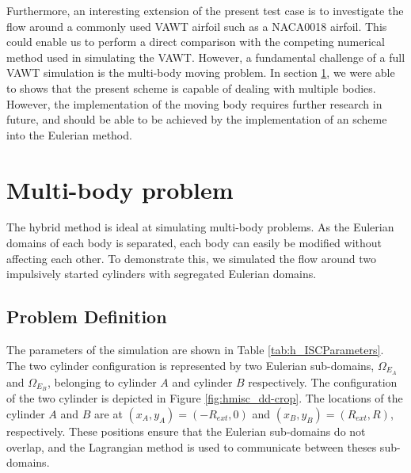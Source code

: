 Furthermore, an interesting extension of the present test case is to investigate the flow around a commonly used VAWT airfoil such as a NACA0018 airfoil. This could enable us to perform a direct comparison with the competing numerical method used in simulating the VAWT. However, a fundamental challenge of a full VAWT simulation is the multi-body moving problem. In section \ref{sec:vvhm-mb}, we were able to shows that the present scheme is capable of dealing with multiple bodies. However, the implementation of the moving body requires further research in future, and should be able to be achieved by the implementation of an  scheme into the Eulerian method.

	
\section{Multi-body problem}
\label{sec:vvhm-mb}

The hybrid method is ideal at simulating multi-body problems. As the Eulerian domains of each body is separated, each body can easily be modified without affecting each other. To demonstrate this, we simulated the flow around two impulsively started cylinders with segregated Eulerian domains. 

\subsection{Problem Definition}

The parameters of the simulation are shown in Table \ref{tab:h_ISCParameters}. The two cylinder configuration is represented by two Eulerian sub-domains, $\Omega_{E_{A}}$ and $\Omega_{E_B}$, belonging to cylinder $A$ and cylinder $B$ respectively. The configuration of the two cylinder is depicted in Figure \ref{fig:hmisc_dd-crop}. The locations of the cylinder $A$ and $B$ are at $(x_A,y_A) = (-R_{ext},0)$ and $(x_B,y_B) = (R_{ext},R)$, respectively. These positions ensure that the Eulerian sub-domains do not overlap, and the Lagrangian method is used to communicate between theses sub-domains.

